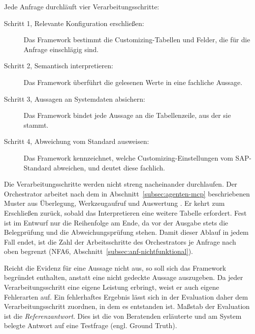 Jede Anfrage durchläuft vier Verarbeitungsschritte:
\begin{description}
	\item[Schritt 1, Relevante Konfiguration erschließen:] Das Framework bestimmt die Customizing-Tabellen und Felder, die für die Anfrage einschlägig sind.
	\item[Schritt 2, Semantisch interpretieren:] Das Framework überführt die gelesenen Werte in eine fachliche Aussage.
	\item[Schritt 3, Aussagen an Systemdaten absichern:] Das Framework bindet jede Aussage an die Tabellenzeile, aus der sie stammt.
	\item[Schritt 4, Abweichung vom Standard ausweisen:] Das Framework kennzeichnet, welche Customizing-Einstellungen vom SAP-Standard abweichen, und deutet diese fachlich.
\end{description}
Die Verarbeitungsschritte werden nicht streng nacheinander durchlaufen. Der Orchestrator arbeitet nach dem in Abschnitt~\ref{subsec:agenten-mcp} beschriebenen Muster aus Überlegung, Werkzeugaufruf und Auswertung \cite{yao_react_2023}. Er kehrt zum Erschließen zurück, sobald das Interpretieren eine weitere Tabelle erfordert. Fest ist im Entwurf nur die Reihenfolge am Ende, da vor der Ausgabe stets die Belegprüfung und die Abweichungsprüfung stehen. Damit dieser Ablauf in jedem Fall endet, ist die Zahl der Arbeitsschritte des Orchestrators je Anfrage nach oben begrenzt (NFA6, Abschnitt~\ref{subsec:anf-nichtfunktional}).

Reicht die Evidenz für eine Aussage nicht aus, so soll sich das Framework begründet enthalten, anstatt eine nicht gedeckte Aussage auszugeben. Da jeder Verarbeitungsschritt eine eigene Leistung erbringt, weist er auch eigene Fehlerarten auf. Ein fehlerhaftes Ergebnis lässt sich in der Evaluation daher dem Verarbeitungsschritt zuordnen, in dem es entstanden ist. Maßstab der Evaluation ist die \emph{Referenzantwort}. Dies ist die von Beratenden erläuterte und am System belegte Antwort auf eine Testfrage (engl. Ground Truth).

